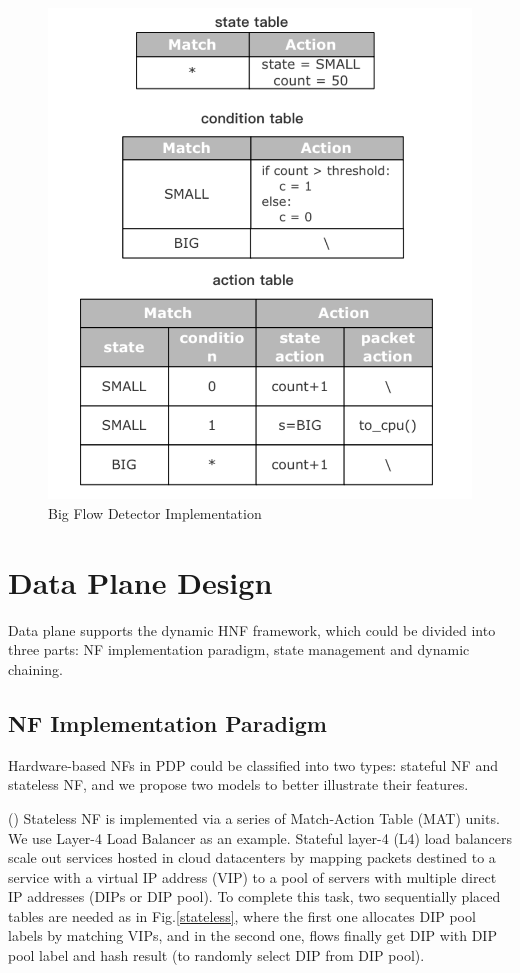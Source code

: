 \documentclass[10pt, conference, letterpaper]{IEEEtran}
\begin{document}
\begin{figure}[t]
\centerline{\includegraphics[scale=0.4]{src/bfd2.png}}
\caption{Big Flow Detector Implementation}
\label{bfd}
\end{figure}


\section{Data Plane Design}
Data plane supports the dynamic HNF framework, which could be divided into three parts: NF implementation paradigm, state management and dynamic chaining.
\subsection{NF Implementation Paradigm}
Hardware-based NFs in PDP could be classified into two types: stateful NF and stateless NF, and we propose two models to better illustrate their features.

(\expandafter{}) Stateless NF is implemented via a series of Match-Action Table (MAT) units. We use Layer-4 Load Balancer as an example. Stateful layer-4 (L4) load balancers scale out services hosted in cloud datacenters by mapping packets destined to a service with a virtual IP address (VIP) to a pool of servers with multiple direct IP addresses (DIPs or DIP pool). 
To complete this task, two sequentially placed tables are needed as in Fig.\ref{stateless}, where the first one allocates DIP pool labels by matching VIPs, and in the second one, flows finally get DIP with DIP pool label and hash result (to randomly select DIP from DIP pool).
\end{document}

